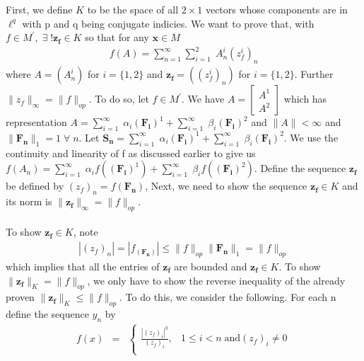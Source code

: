 \documentclass[11pt]{SelfArxOneColBMN}
\begin{document}
\begin{exercise}
\begin{itemize}
        \begin{solution}
            First, we define $K$ to be the space of all $2 \times 1$ vectors whose components are in $\ell^q$ with p and q being conjugate indicies. We want to prove that, with $f \in M^\prime, \; \exists \; !\mathbf{z_f} \in K$ so that for any $\mathbf{x} \in M$
            \begin{eqnarray*}
                f(A) = \sum_{n=1}^\infty\sum_{i=1}^2\;A_n^i(z^i_f)_n
            \end{eqnarray*}
            where $A = (A_n^i)$ for $i = \{1,2\}$ and $\mathbf{z_f} = ((z_f^i)_n)$ for $i = \{1,2\}$. Further $\|z_f\|_\infty = \|f\|_{op}$. To do so, let $f \in M^\prime$. We have $A =
            \begin{bmatrix}
            A^1\\
            A^2
            \end{bmatrix}
            $
            which has representation $A = \sum_{i=1}^\infty\;\alpha_i\mathbf{(F_i)}^1 + \sum_{i=1}^\infty\;\beta_i\mathbf{(F_i)}^2$ and $\|A\| < \infty$ and $\|\mathbf{F_n}\|_1 = 1 \; \forall \; n$. Let $\mathbf{S_n} = \sum_{i=1}^\infty\;\alpha_i\mathbf{(F_i)}^1 + \sum_{i=1}^\infty\;\beta_i\mathbf{(F_i)}^2$. We use the continuity and linearity of f as discussed earlier to give us $f(A_n) = \sum_{i=1}^\infty\;\alpha_i f(\mathbf{(F_i)}^1) + \sum_{i=1}^\infty\;\beta_i  f(\mathbf{(F_i)}^2)$. Define the sequence $\mathbf{z_f}$ be defined by $(z_f)_n = f(\mathbf{F_n})$, Next, we need to show the sequence $\mathbf{z_f} \in K$ and its norm is $\|\mathbf{z_f}\|_\infty = \|f\|_{op}$.\\
            \\
            To show $\mathbf{z_f} \in K$, note 
            \begin{eqnarray*}
                |(z_f)_n| = |f_(\mathbf{F_n})| \leq \|f\|_{op}\|\mathbf{F_n}\|_1 = \|f\|_{op}
            \end{eqnarray*}
            which implies that all the entries of $\mathbf{z_f}$ are bounded and $\mathbf{z_f} \in K$. To show $\|\mathbf{z_f}\|_K = \|f\|_{op}$, we only have to show the reverse inequality of the already proven $\|\mathbf{z_f}\|_K \leq \|f\|_{op}$. To do this, we consider the following. For each n define the sequence $y_n$ by
                \begin{eqnarray*}
                f(x) &=&
                \left \{
                    \begin{array}{ll}
                        \frac{|(z_f)_i|^q}{(z_f)_i}, & 1 \leq i < n \; \text{and} (z_f)_i \neq 0\\

\end{array}
\end{eqnarray*}
\end{solution}
\end{itemize}
\end{exercise}
\end{document}
